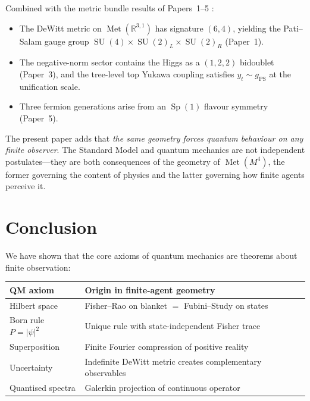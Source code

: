 \documentclass[12pt,a4paper]{article}
\theoremstyle{definition}
\newcommand{\Met}{\operatorname{Met}}
\newcommand{\SU}{\operatorname{SU}}
\newcommand{\Sp}{\operatorname{Sp}}
\newcommand{\R}{\mathbb{R}}
\begin{document}
Combined with the metric bundle results of Papers~1--5
\cite{Paper1,Paper2,Paper3,Paper4,Paper5}:
\begin{itemize}
\item The DeWitt metric on $\Met(\R^{3,1})$ has signature $(6,4)$,
  yielding the Pati--Salam gauge group $\SU(4) \times \SU(2)_L \times
  \SU(2)_R$ (Paper~1).
\item The negative-norm sector contains the Higgs as a $(1,2,2)$
  bidoublet (Paper~3), and the tree-level top Yukawa coupling satisfies
  $y_t \sim g_{\mathrm{PS}}$ at the unification scale.
\item Three fermion generations arise from an $\Sp(1)$ flavour symmetry
  (Paper~5).
\end{itemize}
The present paper adds that \emph{the same geometry forces quantum
behaviour on any finite observer}. The Standard Model and quantum
mechanics are not independent postulates---they are both consequences
of the geometry of $\Met(M^4)$, the former governing the content of
physics and the latter governing how finite agents perceive it.

\section{Conclusion}
\label{sec:conclusion}

We have shown that the core axioms of quantum mechanics are theorems
about finite observation:

\begin{center}
\begin{tabular}{ll}
\toprule
\textbf{QM axiom} & \textbf{Origin in finite-agent geometry} \\
\midrule
Hilbert space & Fisher--Rao on blanket $=$ Fubini--Study on states \\
Born rule $P = |\psi|^2$ & Unique rule with state-independent Fisher trace \\
Superposition & Finite Fourier compression of positive reality \\
Uncertainty & Indefinite DeWitt metric creates complementary observables \\
Quantised spectra & Galerkin projection of continuous operator \\
\bottomrule
\end{tabular}
\end{center}
\end{document}
